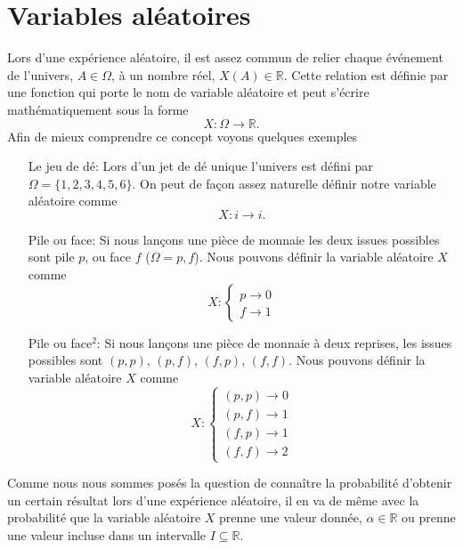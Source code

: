 \documentclass[a4paper,12pt]{book}
\newcommand{\real}{\mathbb{R}}
\begin{document}
\section{Variables aléatoires}

Lors d'une expérience aléatoire, il est assez commun de relier chaque événement de l'univers, $A\in\Omega$, à un nombre réel, $X(A)\in\real$. 
Cette relation est définie par une fonction qui porte le nom de variable aléatoire et peut s'écrire mathématiquement sous la forme
\begin{equation}
 X:\Omega\rightarrow \real.
\end{equation}
Afin de mieux comprendre ce concept voyons quelques exemples
\begin{enumerate}
 \item[Le jeu de dé:] Lors d'un jet de dé unique l'univers est défini par $\Omega=\{1,2,3,4,5,6\}$. On peut de façon assez naturelle 
 définir notre variable aléatoire comme
 \begin{equation}
  X:i\rightarrow i.
 \end{equation}
 \item[Pile ou face:] Si nous lançons une pièce de monnaie les deux issues possibles sont pile $p$, ou face $f$ ($\Omega={p,f}$). 
 Nous pouvons définir la variable aléatoire $X$ comme
 \begin{equation}
  X:\left\{\begin{array}{l}
                p\rightarrow 0\\
                f\rightarrow 1
               \end{array}\right.
 \end{equation}
 \item[Pile ou face$^2$:] Si nous lançons une pièce de monnaie à deux reprises, les issues possibles sont $(p,p)$, 
 $(p,f)$, $(f,p)$, $(f,f)$. Nous pouvons définir la variable aléatoire $X$ comme
 \begin{equation}
  X:\left\{\begin{array}{l}
                (p,p)\rightarrow 0\\
                (p,f)\rightarrow 1\\
                (f,p)\rightarrow 1\\
                (f,f)\rightarrow 2
               \end{array}\right.
 \end{equation}
\end{enumerate}
Comme nous nous sommes posés la question de connaître la probabilité d'obtenir un certain résultat lors d'une expérience aléatoire, il en va de même 
avec la probabilité que la variable aléatoire $X$ prenne une valeur donnée, $\alpha\in\real$ ou prenne une valeur incluse dans un intervalle $I\subseteq\real$. 
\end{document}
